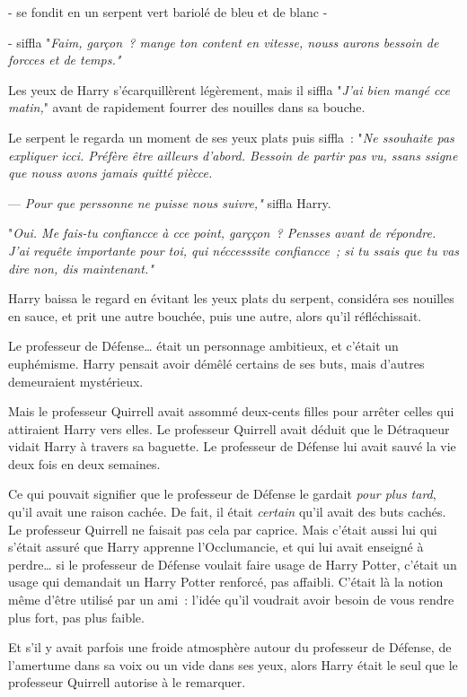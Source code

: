 - se fondit en un serpent vert bariolé de bleu et de blanc -

- siffla "\emph{Faim, garçon~? mange ton content en vitesse, nouss aurons bessoin de forcces et de temps."}

Les yeux de Harry s'écarquillèrent légèrement, mais il siffla "\emph{J'ai bien mangé cce matin,}" avant de rapidement fourrer des nouilles dans sa bouche.

Le serpent le regarda un moment de ses yeux plats puis siffla~: "\emph{Ne ssouhaite pas expliquer icci. Préfère être ailleurs d'abord. Bessoin de partir pas vu, ssans ssigne que nouss avons jamais quitté piècce.}

--- \emph{Pour que perssonne ne puisse nous suivre,"} siffla Harry.

"\emph{Oui. Me fais-tu confiancce à cce point, garççon~? Pensses avant de répondre. J'ai requête importante pour toi, qui néccesssite confiancce~; si tu ssais que tu vas dire non, dis maintenant."}

Harry baissa le regard en évitant les yeux plats du serpent, considéra ses nouilles en sauce, et prit une autre bouchée, puis une autre, alors qu'il réfléchissait.

Le professeur de Défense… était un personnage ambitieux, et c'était un euphémisme. Harry pensait avoir démêlé certains de ses buts, mais d'autres demeuraient mystérieux.

Mais le professeur Quirrell avait assommé deux-cents filles pour arrêter celles qui attiraient Harry vers elles. Le professeur Quirrell avait déduit que le Détraqueur vidait Harry à travers sa baguette. Le professeur de Défense lui avait sauvé la vie deux fois en deux semaines.

Ce qui pouvait signifier que le professeur de Défense le gardait \emph{pour plus tard}, qu'il avait une raison cachée. De fait, il était \emph{certain} qu'il avait des buts cachés. Le professeur Quirrell ne faisait pas cela par caprice. Mais c'était aussi lui qui s'était assuré que Harry apprenne l'Occlumancie, et qui lui avait enseigné à perdre… si le professeur de Défense voulait faire usage de Harry Potter, c'était un usage qui demandait un Harry Potter renforcé, pas affaibli. C'était là la notion même d'être utilisé par un ami~: l'idée qu'il voudrait avoir besoin de vous rendre plus fort, pas plus faible.

Et s'il y avait parfois une froide atmosphère autour du professeur de Défense, de l'amertume dans sa voix ou un vide dans ses yeux, alors Harry était le seul que le professeur Quirrell autorise à le remarquer.

